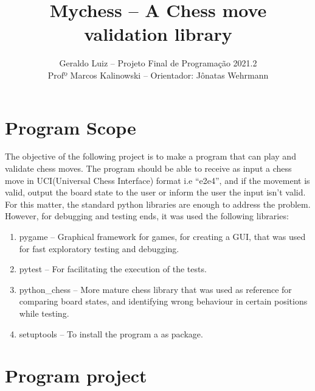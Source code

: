 \documentclass[10pt]{article}
\author{Geraldo Luiz -- Projeto Final de Programação 2021.2\\ Profº Marcos
Kalinowski -- Orientador: Jônatas Wehrmann}
\title{Mychess -- A Chess move validation library}
\date{}
\begin{document}
\maketitle

\section{Program Scope}

The objective of the following project is to make a program that can play and
validate chess moves. The program should be able to receive as input a chess move in UCI(Universal Chess Interface) format i.e
``e2e4'', and if the movement is valid, output the board state to the user or inform
the user the input isn't valid. For this matter, the standard python libraries
are enough to address the problem. However, for debugging and testing ends, it was
used the following libraries:

\begin{enumerate}[label=\alph*)]
\item pygame -- Graphical framework for games, for creating a GUI, that was used
    for fast exploratory testing and debugging.
\item pytest -- For facilitating the execution of the tests.
\item python\_chess -- More mature chess library that was used as reference for comparing board states, and identifying wrong behaviour in certain positions while testing.
\item setuptools -- To install the program a as package.
\end{enumerate}



\section{Program project}
\end{document}
